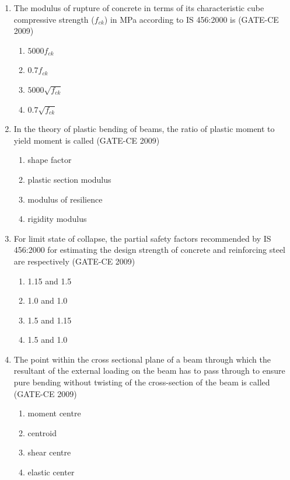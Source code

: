 \documentclass[12pt]{article}
\begin{document}
\begin{enumerate}[label=Q.\arabic*]
    \item The modulus of rupture of concrete in terms of its characteristic cube compressive strength ($f_{ck}$) in MPa according to IS 456:2000 is (GATE-CE 2009)
    \begin{enumerate}[label=(\Alph*)]
        \item $5000f_{ck}$ 
        \item $0.7f_{ck}$ 
        \item $5000\sqrt{f_{ck}}$ 
        \item $0.7\sqrt{f_{ck}}$
    \end{enumerate}
    
    \item In the theory of plastic bending of beams, the ratio of plastic moment to yield moment is called (GATE-CE 2009)
    \begin{enumerate}[label=(\Alph*)]
        \item shape factor 
        \item plastic section modulus 
        \item modulus of resilience 
        \item rigidity modulus
    \end{enumerate}
    
    \item For limit state of collapse, the partial safety factors recommended by IS 456:2000 for estimating the design strength of concrete and reinforcing steel are respectively (GATE-CE 2009)
    \begin{enumerate}[label=(\Alph*)]
        \item 1.15 and 1.5 
        \item 1.0 and 1.0 
        \item 1.5 and 1.15 
        \item 1.5 and 1.0
    \end{enumerate}
    
    \item The point within the cross sectional plane of a beam through which the resultant of the external loading on the beam has to pass through to ensure pure bending without twisting of the cross-section of the beam is called (GATE-CE 2009)
    \begin{enumerate}[label=(\Alph*)]
        \item moment centre 
        \item centroid 
        \item shear centre 
        \item elastic center
    \end{enumerate}
    

\end{enumerate}
\end{document}
